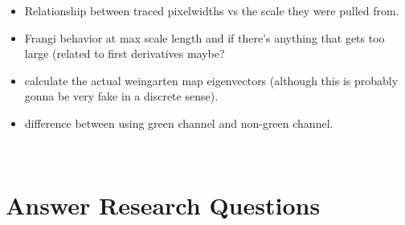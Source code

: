 \begin{itemize}
	\item Relationship between traced pixelwidths vs the scale they were pulled from.
	\item Frangi behavior at max scale length and if there's anything that gets too large (related to first derivatives maybe?
	\item calculate the actual weingarten map eigenvectors (although this is
	probably gonna be very fake in a discrete sense).
	\item difference between using green channel and non-green channel.
\end{itemize}

\
\section{Answer Research Questions}
